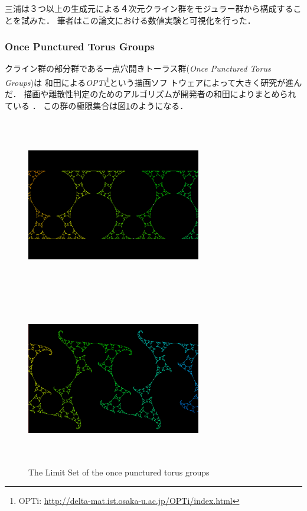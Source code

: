 三浦は３つ以上の生成元による４次元クライン群をモジュラー群から構成するこ
とを試みた\cite{miura2015master}．
筆者はこの論文における数値実験と可視化を行った．

\subsubsection{Once Punctured Torus Groups}

クライン群の部分群である一点穴開きトーラス群({\it Once Punctured Torus Groups})は
和田による{\it OPTi}\footnote{OPTi:
\url{http://delta-mat.ist.osaka-u.ac.jp/OPTi/index.html}}という描画ソフ
トウェアによって大きく研究が進んだ．
描画や離散性判定のためのアルゴリズムが開発者の和田によりまとめられている
\cite{wada2003optiDrawingLimit}\cite{wada2006optiDiscreteness}．
この群の極限集合は図\ref{fig:opt}のようになる．

 \begin{figure}[htbp]
  \begin{minipage}{0.5\hsize}
   \center
   \includegraphics[width=3in, height=3in,
   keepaspectratio]{../img/klein/opt1N.pdf}
   \subcaption{}
  \end{minipage}
  \begin{minipage}{0.5\hsize}
   \center
   \includegraphics[width=3in, height=3in,
   keepaspectratio]{../img/klein/opt2N.pdf}
   \subcaption{}
  \end{minipage}
  \caption{The Limit Set of the once punctured torus groups}
  \label{fig:opt}
 \end{figure}

